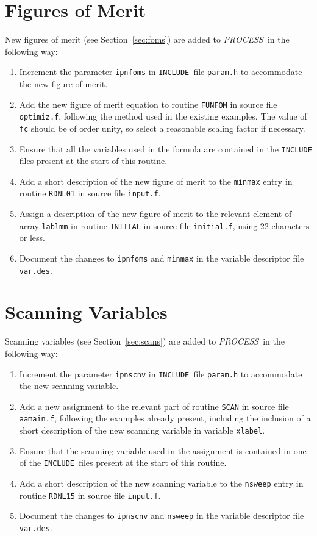 \documentclass[11pt,a4paper]{report}
\newcommand{\PS}{\mbox{\it PROCESS\/ }}
\newcommand{\INCLUDE}{\mbox{\tt INCLUDE }}
\begin{document}
\section{Figures of Merit}

New figures of merit (see Section~\ref{sec:foms}) are added to \PS in
the following way:

\begin{enumerate}
\item
Increment the parameter {\tt ipnfoms} in \INCLUDE file {\tt param.h}
to accommodate the new figure of merit.
\item
Add the new figure of merit equation to routine {\tt FUNFOM} in source
file {\tt optimiz.f}, following the method used in the existing
examples. The value of {\tt fc} should be of order unity, so select a
reasonable scaling factor if necessary.
\item
Ensure that all the variables used in the formula are contained in the
\INCLUDE files present at the start of this routine.
\item
Add a short description of the new figure of merit to the {\tt minmax}
entry in routine {\tt RDNL01} in source file {\tt input.f}.
\item
Assign a description of the new figure of merit to the relevant
element of array {\tt lablmm} in routine {\tt INITIAL} in source file
{\tt initial.f}, using 22 characters or less.
\item
Document the changes to {\tt ipnfoms} and {\tt minmax} in the variable
descriptor file {\tt var.des}.
\end{enumerate}

\section{Scanning Variables}

Scanning variables (see Section~\ref{sec:scans}) are added to \PS in
the following way:

\begin{enumerate}
\item
Increment the parameter {\tt ipnscnv} in \INCLUDE file {\tt param.h}
to accommodate the new scanning variable.
\item
Add a new assignment to the relevant part of routine {\tt SCAN} in
source file {\tt aamain.f}, following the examples already present,
including the inclusion of a short description of the new scanning
variable in variable {\tt xlabel}.
\item
Ensure that the scanning variable used in the assignment is contained
in one of the \INCLUDE files present at the start of this routine.
\item
Add a short description of the new scanning variable to the {\tt nsweep}
entry in routine {\tt RDNL15} in source file {\tt input.f}.
\item
Document the changes to {\tt ipnscnv} and {\tt nsweep} in the variable
descriptor file {\tt var.des}.
\end{enumerate}
\end{document}
